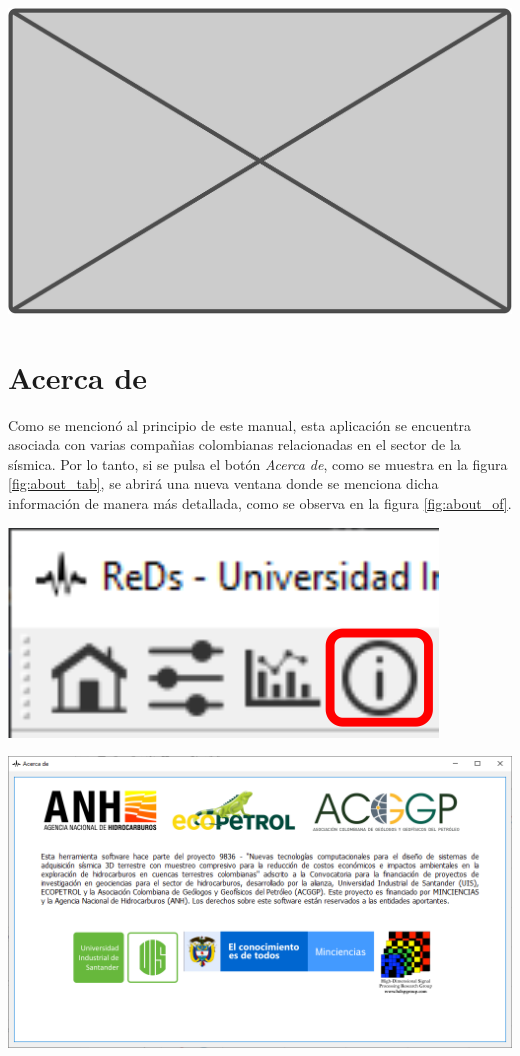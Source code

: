 \documentclass[12pt,twoside,letter]{ol-softwaremanual}
\newenvironment{Figure}
  {\par\medskip\noindent\minipage{\linewidth}}
  {\endminipage\par\medskip}
\begin{document}
\begin{Figure}
	\centering
	\includegraphics[width=0.75\linewidth]{figures/blank}
	\label{fig:rd}
\end{Figure}

\newpage
\section{Acerca de}

Como se mencionó al principio de este manual, esta aplicación se encuentra asociada con varias compañias colombianas relacionadas en el sector de la sísmica. Por lo tanto, si se pulsa el botón \emph{Acerca de}, como se muestra en la figura \ref{fig:about_tab}, se abrirá una nueva ventana donde se menciona dicha información de manera más detallada, como se observa en la figura \ref{fig:about_of}.

\begin{Figure}
    \centering
    \includegraphics[width=0.25\linewidth]{about-tab.png}
    \label{fig:about_tab}
\end{Figure}

\begin{Figure}
    \centering
    \includegraphics[width=1\linewidth]{about.png}
    \label{fig:about_of}
\end{Figure}
\end{document}
